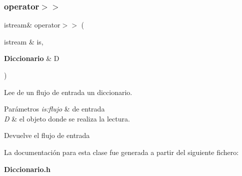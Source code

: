 \subsubsection{operator$>$$>$}
{\footnotesize\ttfamily istream\& operator$>$$>$ (\begin{DoxyParamCaption}\item[{istream \&}]{is,  }\item[{\textbf{ Diccionario} \&}]{D }\end{DoxyParamCaption})\hspace{0.3cm}{\ttfamily [friend]}}



Lee de un flujo de entrada un diccionario. 


\begin{DoxyParams}{Parámetros}
{\em is\+:flujo} & de entrada \\
\hline
{\em D} & el objeto donde se realiza la lectura. \\
\hline
\end{DoxyParams}
\begin{DoxyReturn}{Devuelve}
el flujo de entrada 
\end{DoxyReturn}


La documentación para esta clase fue generada a partir del siguiente fichero\+:\begin{DoxyCompactItemize}
\item 
\textbf{ Diccionario.\+h}\end{DoxyCompactItemize}
